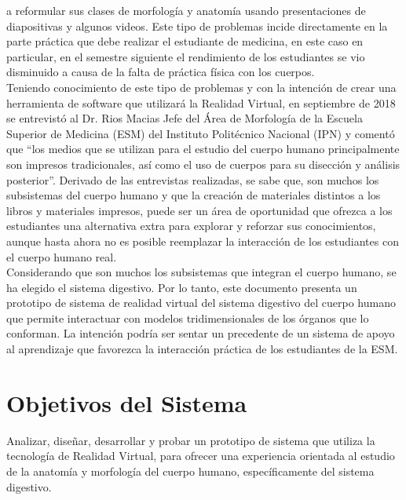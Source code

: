 a reformular sus clases de morfología y anatomía usando presentaciones de diapositivas y algunos videos. Este tipo de problemas incide directamente 
en la parte práctica que debe realizar el estudiante de medicina, en este caso en particular, en el semestre siguiente el rendimiento de los estudiantes 
se vio disminuido a causa de la falta de práctica física con los cuerpos.\\
Teniendo conocimiento de este tipo de problemas y con la intención de crear una herramienta de software que utilizará la Realidad Virtual, en septiembre 
de 2018 se entrevistó al Dr. Rios Macias Jefe del Área de Morfología de la Escuela Superior de Medicina (ESM) del Instituto Politécnico Nacional (IPN) y 
comentó que “los medios que se utilizan para el estudio del cuerpo humano principalmente son impresos tradicionales, así como el uso de cuerpos para su 
disección y análisis posterior”. Derivado de las entrevistas realizadas, se sabe que, son muchos los subsistemas del cuerpo humano y que la creación de 
materiales distintos a los libros y materiales impresos, puede ser un área de oportunidad que ofrezca a los estudiantes una alternativa extra para explorar 
y reforzar sus conocimientos, aunque hasta ahora no es posible reemplazar la interacción de los estudiantes con el cuerpo humano real.\\
Considerando que son muchos los subsistemas que integran el cuerpo humano, se ha elegido el sistema digestivo. Por lo tanto, este documento 
presenta un prototipo de sistema de realidad virtual del sistema digestivo del cuerpo humano que permite interactuar con modelos tridimensionales 
de los órganos que lo conforman. La intención podría ser sentar un precedente de un sistema de apoyo al aprendizaje que favorezca la 
interacción práctica\cite{moore1995learning} de los estudiantes de la ESM.\\

\section{Objetivos del Sistema}
Analizar, diseñar, desarrollar y probar un prototipo de sistema que utiliza la tecnología de Realidad Virtual, para ofrecer una experiencia orientada al estudio 
de la anatomía y morfología del cuerpo humano, específicamente del sistema digestivo.\\
